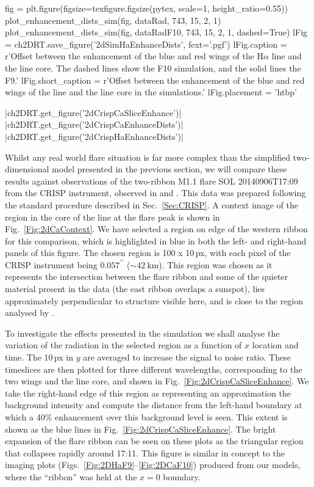 \begin{pycode}[2DRT]
fig = plt.figure(figsize=texfigure.figsize(pytex, scale=1, height_ratio=0.55))
plot_enhancement_dists_sim(fig, dataRad, 743, 15, 2, 1)
plot_enhancement_dists_sim(fig, dataRadF10, 743, 15, 2, 1, dashed=True)
lFig = ch2DRT.save_figure('2dSimHaEnhanceDists', fext='.pgf')
lFig.caption = r'Offset between the enhancement of the blue and red wings of the H$\alpha$ line and the line core. The dashed lines show the F10 simulation, and the solid lines the F9.'
lFig.short_caption = r'Offset between the enhancement of the blue and red wings of the \Ha{} line and the line core in the simulations.'
lFig.placement = 'htbp'
\end{pycode}

\py[2DRT]|ch2DRT.get_figure('2dCrispCaSliceEnhance')|
\py[2DRT]|ch2DRT.get_figure('2dCrispCaEnhanceDists')|
\py[2DRT]|ch2DRT.get_figure('2dCrispHaEnhanceDists')|

Whilst any real world flare situation is far more complex than the simplified two-dimensional model presented in the previous section, we will compare these results against observations of the two-ribbon M1.1 flare SOL 20140906T17:09 from the CRISP instrument, observed in \Ha{} and \CaLine{}.
This data was prepared following the standard procedure described in Sec.~\ref{Sec:CRISP}.
A context image of the region in the core of the \CaLine{} line at the flare peak is shown in Fig.~\ref{Fig:2dCaContext}.
We have selected a region on edge of the western ribbon for this comparison, which is highlighted in blue in both the left- and right-hand panels of this figure.
The chosen region is 100 x 10\,{}px, with each pixel of the CRISP instrument being $0.057^{\prime\prime}$ ($\sim\SI{42}{\kilo\metre}$).
This region was chosen as it represents the intersection between the flare ribbon and some of the quieter material present in the data (the east ribbon overlaps a sunspot), lies approximately perpendicular to structure visible here, and is close to the region analysed by \citet{Kuridze2015}.

To investigate the effects presented in the simulation we shall analyse the variation of the radiation in the selected region as a function of $x$ location and time.
The 10\,{}px in $y$ are averaged to increase the signal to noise ratio.
These timeslices are then plotted for three different wavelengths, corresponding to the two wings and the line core, and shown in Fig.~\ref{Fig:2dCrispCaSliceEnhance}.
We take the right-hand edge of this region as representing an approximation the background intensity and compute the distance from the left-hand boundary at which a 40\% enhancement over this background level is seen.
This extent is shown as the blue lines in Fig.~\ref{Fig:2dCrispCaSliceEnhance}.
The bright expansion of the flare ribbon can be seen on these plots as the triangular region that collapses rapidly around 17:11.
This figure is similar in concept to the imaging plots (Figs.~\ref{Fig:2DHaF9}--\ref{Fig:2DCaF10}) produced from our models, where the ``ribbon'' was held at the $x=0$ boundary.

